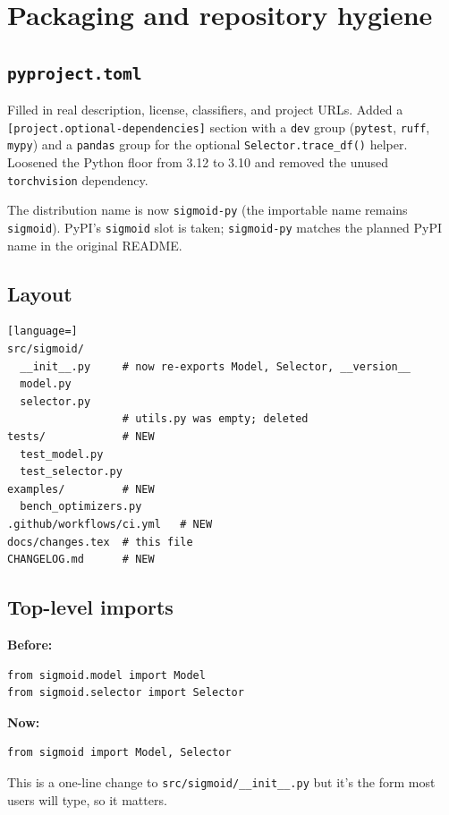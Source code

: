 \documentclass[11pt]{article}
\begin{document}
\section{Packaging and repository hygiene}

\subsection{\texttt{pyproject.toml}}

Filled in real description, license, classifiers, and project URLs. Added a
\texttt{[project.optional-dependencies]} section with a \texttt{dev} group
(\texttt{pytest}, \texttt{ruff}, \texttt{mypy}) and a \texttt{pandas} group for
the optional \texttt{Selector.trace\_df()} helper. Loosened the Python floor
from 3.12 to 3.10 and removed the unused \texttt{torchvision} dependency.

The distribution name is now \texttt{sigmoid-py} (the importable name remains
\texttt{sigmoid}). PyPI's \texttt{sigmoid} slot is taken; \texttt{sigmoid-py}
matches the planned PyPI name in the original README.

\subsection{Layout}

\begin{lstlisting}[language=]
src/sigmoid/
  __init__.py     # now re-exports Model, Selector, __version__
  model.py
  selector.py
                  # utils.py was empty; deleted
tests/            # NEW
  test_model.py
  test_selector.py
examples/         # NEW
  bench_optimizers.py
.github/workflows/ci.yml   # NEW
docs/changes.tex  # this file
CHANGELOG.md      # NEW
\end{lstlisting}

\subsection{Top-level imports}

\textbf{Before:}
\begin{lstlisting}
from sigmoid.model import Model
from sigmoid.selector import Selector
\end{lstlisting}

\textbf{Now:}
\begin{lstlisting}
from sigmoid import Model, Selector
\end{lstlisting}

This is a one-line change to \texttt{src/sigmoid/\_\_init\_\_.py} but it's the
form most users will type, so it matters.
\end{document}
